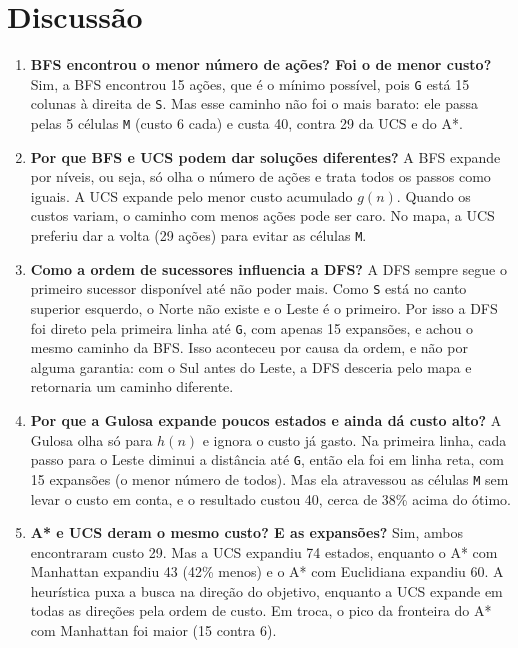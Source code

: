 \documentclass[12pt]{article}
\begin{document}
\section{Discussão}
\begin{enumerate}
\item \textbf{BFS encontrou o menor número de ações? Foi o de menor custo?} Sim, a BFS encontrou 15 ações, que é o mínimo possível, pois \texttt{G} está 15 colunas à direita de \texttt{S}. Mas esse caminho não foi o mais barato: ele passa pelas 5 células \texttt{M} (custo 6 cada) e custa 40, contra 29 da UCS e do A*.

\item \textbf{Por que BFS e UCS podem dar soluções diferentes?} A BFS expande por níveis, ou seja, só olha o número de ações e trata todos os passos como iguais. A UCS expande pelo menor custo acumulado $g(n)$. Quando os custos variam, o caminho com menos ações pode ser caro. No mapa, a UCS preferiu dar a volta (29 ações) para evitar as células \texttt{M}.

\item \textbf{Como a ordem de sucessores influencia a DFS?} A DFS sempre segue o primeiro sucessor disponível até não poder mais. Como \texttt{S} está no canto superior esquerdo, o Norte não existe e o Leste é o primeiro. Por isso a DFS foi direto pela primeira linha até \texttt{G}, com apenas 15 expansões, e achou o mesmo caminho da BFS. Isso aconteceu por causa da ordem, e não por alguma garantia: com o Sul antes do Leste, a DFS desceria pelo mapa e retornaria um caminho diferente.

\item \textbf{Por que a Gulosa expande poucos estados e ainda dá custo alto?} A Gulosa olha só para $h(n)$ e ignora o custo já gasto. Na primeira linha, cada passo para o Leste diminui a distância até \texttt{G}, então ela foi em linha reta, com 15 expansões (o menor número de todos). Mas ela atravessou as células \texttt{M} sem levar o custo em conta, e o resultado custou 40, cerca de 38\% acima do ótimo.

\item \textbf{A* e UCS deram o mesmo custo? E as expansões?} Sim, ambos encontraram custo 29. Mas a UCS expandiu 74 estados, enquanto o A* com Manhattan expandiu 43 (42\% menos) e o A* com Euclidiana expandiu 60. A heurística puxa a busca na direção do objetivo, enquanto a UCS expande em todas as direções pela ordem de custo. Em troca, o pico da fronteira do A* com Manhattan foi maior (15 contra 6).


\end{enumerate}
\end{document}
